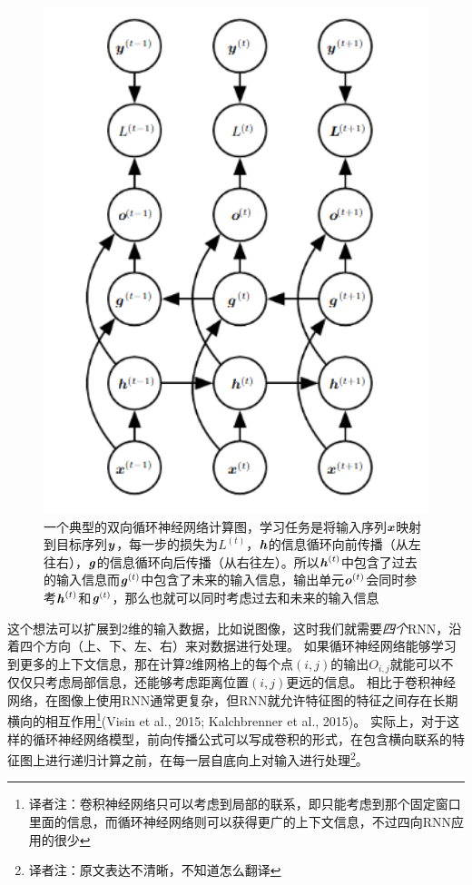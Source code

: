 \begin{figure}[htbp] %
   \centering
   \includegraphics[width=6in]{fig/chap10/10_11.PNG} 
   \caption{一个典型的双向循环神经网络计算图，学习任务是将输入序列$\boldsymbol{\mathit{x}}$映射到目标序列$\boldsymbol{\mathit{y}}$，每一步的损失为$L^{(t)}$，$\boldsymbol{\mathit{h}}$的信息循环向前传播（从左往右），$\boldsymbol{\mathit{g}}$的信息循环向后传播（从右往左）。所以$\boldsymbol{\mathit{h}}^{(t)}$中包含了过去的输入信息而$\boldsymbol{\mathit{g}}^{(t)}$中包含了未来的输入信息，输出单元$\boldsymbol{\mathit{o}}^{(t)}$会同时参考$\boldsymbol{\mathit{h}}^{(t)}$和$\boldsymbol{\mathit{g}}^{(t)}$，那么也就可以同时考虑过去和未来的输入信息}
   \label{fig:10_11}
\end{figure}

这个想法可以扩展到2维的输入数据，比如说图像，这时我们就需要\emph{四个}RNN，沿着四个方向（上、下、左、右）来对数据进行处理。
如果循环神经网络能够学习到更多的上下文信息，那在计算2维网格上的每个点$(i, j)$的输出$O_{i,j}$就能可以不仅仅只考虑局部信息，还能够考虑距离位置$(i, j)$更远的信息。
相比于卷积神经网络，在图像上使用RNN通常更复杂，但RNN就允许特征图的特征之间存在长期横向的相互作用\footnote{译者注：卷积神经网络只可以考虑到局部的联系，即只能考虑到那个固定窗口里面的信息，而循环神经网络则可以获得更广的上下文信息，不过四向RNN应用的很少}(Visin et al., 2015; Kalchbrenner et al., 2015)。
实际上，对于这样的循环神经网络模型，前向传播公式可以写成卷积的形式，在包含横向联系的特征图上进行递归计算之前，在每一层自底向上对输入进行处理\footnote{译者注：原文表达不清晰，不知道怎么翻译}。

